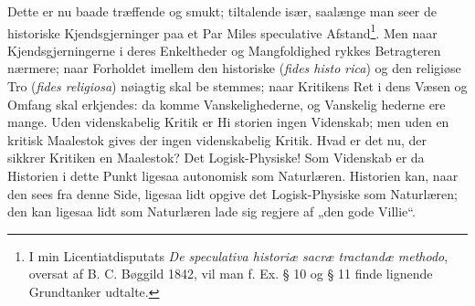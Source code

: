 \documentclass[12pt]{book}
\begin{document}
Dette er nu baade træffende og smukt; tiltalende især,
saalænge man seer de historiske Kjendsgjerninger paa et Par
Miles speculative Afstand\footnote{I min Licentiatdisputats
\textit{De speculativa historiæ sacræ tractandæ methodo}, oversat af
B. C. Bøggild 1842, vil man f. Ex. § 10 og § 11 finde lignende
Grundtanker udtalte.}. Men naar Kjendsgjerningerne
i deres Enkeltheder og Mangfoldighed rykkes Betragteren
nærmere; naar Forholdet imellem den historiske (\textit{fides histo\-%
rica}) og den religiøse Tro (\textit{fides religiosa}) nøiagtig skal be\-%
stemmes; naar Kritikens Ret i dens Væsen og Omfang
skal erkjendes: da komme Vanskelighederne, og Vanskelig\-%
hederne ere mange. Uden videnskabelig Kritik er Hi\-%
storien ingen Videnskab; men uden en kritisk Maalestok
gives der ingen videnskabelig Kritik. Hvad er det nu, der
sikkrer Kritiken en Maalestok? Det Logisk-Physiske! Som
Videnskab er da Historien i dette Punkt ligesaa autonomisk
som Naturlæren. Historien kan, naar den sees fra denne
Side, ligesaa lidt opgive det Logisk-Physiske som Naturlæren;
den kan ligesaa lidt som Naturlæren lade sig regjere af „den
gode Villie“.
\end{document}
